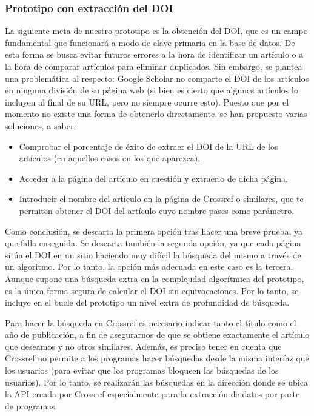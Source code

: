\subsubsection{Prototipo con extracción del DOI}

La siguiente meta de nuestro prototipo es la obtención del DOI, que es un campo fundamental que funcionará a modo de clave primaria en la base de datos. De esta forma se busca evitar futuros errores a la hora de identificar un artículo o a la hora de comparar artículos para eliminar duplicados. Sin embargo, se plantea una problemática al respecto: Google Scholar no comparte el DOI de los artículos en ninguna división de su página web (si bien es cierto que algunos artículos lo incluyen al final de su URL, pero no siempre ocurre esto). Puesto que por el momento no existe una forma de obtenerlo directamente, se han propuesto varias soluciones, a saber:
\begin{itemize}
	\item Comprobar el porcentaje de éxito de extraer el DOI de la URL de los artículos (en aquellos casos en los que aparezca).
	\item Acceder a la página del artículo en cuestión y extraerlo de dicha página.
         \item Introducir el nombre del artículo en la página de \href{https://www.crossref.org/}{Crossref} o similares, que te permiten obtener el DOI del artículo cuyo nombre pases como parámetro.
\end{itemize}
Como conclusión, se descarta la primera opción tras hacer una breve prueba, ya que falla enseguida. Se descarta también la segunda opción, ya que cada página sitúa el DOI en un sitio haciendo muy difícil la búsqueda del mismo a través de un algoritmo. Por lo tanto, la opción más adecuada en este caso es la tercera. Aunque supone una búsqueda extra en la complejidad algorítmica del prototipo, es la única forma segura de calcular el DOI sin equivocaciones. Por lo tanto, se incluye en el bucle del prototipo un nivel extra de profundidad de búsqueda.

Para hacer la búsqueda en Crossref es necesario indicar tanto el título como el año de publicación, a fin de asegurarnos de que se obtiene exactamente el artículo que deseamos y no otros similares. Además, es preciso tener en cuenta que Crossref no permite a los programas hacer búsquedas desde la misma interfaz que los usuarios (para evitar que los programas bloqueen las búsquedas de los usuarios). Por lo tanto, se realizarán las búsquedas en la dirección donde se ubica la API creada por Crossref especialmente para la extracción de datos por parte de programas.

